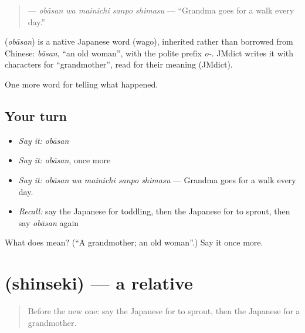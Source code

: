 \begin{quote}
\textbf{  } — \emph{obāsan wa mainichi sanpo shimasu} — \textquotedblleft{}Grandma goes for a walk every day.\textquotedblright{}
\end{quote}

\begin{cousinweb}
\textbf{} (\emph{obāsan}) is a native Japanese word (wago), inherited rather than borrowed from Chinese: \emph{bāsan}, \textquotedblleft{}an old woman\textquotedblright{}, with the polite prefix \emph{o-}. JMdict writes it with characters for \textquotedblleft{}grandmother\textquotedblright{}, read for their meaning (JMdict).
\end{cousinweb}

\begin{grammarlens}[title={What you've built}]
One more word for telling what happened.
\end{grammarlens}

\subsection*{Your turn}
\begin{itemize}
\raggedright
  \item \emph{Say it:} \emph{obāsan}
  \item \emph{Say it:} \emph{obāsan}, once more
  \item \emph{Say it:} \emph{obāsan wa mainichi sanpo shimasu} — Grandma goes for a walk every day.
  \item \emph{Recall:} say the Japanese for toddling, then the Japanese for to sprout, then say \emph{obāsan} again
\end{itemize}

\begin{tcolorbox}[breakable,colback=teal!4,colframe=teal!35!black,title={Before you move on}]
What does  mean? (\textquotedblleft{}A grandmother; an old woman\textquotedblright{}.) Say it once more.
\end{tcolorbox}
\section[\texorpdfstring{\ja{しんせき} (shinseki)}{しんせき (shinseki)}]{ (shinseki) — a relative}

\label{lesson:JA-C287-shinseki}



\begin{quote}
Before the new one: say the Japanese for to sprout, then the Japanese for a grandmother.
\end{quote}

